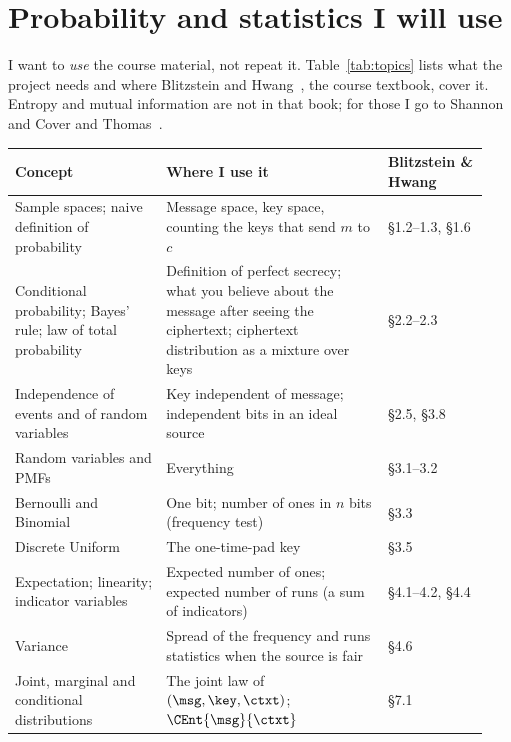 \section{Probability and statistics I will use}\label{sec:topics}

I want to \emph{use} the course material, not repeat it.
Table~\ref{tab:topics} lists what the project needs and where Blitzstein and
Hwang~\cite{blitzstein2015}, the course textbook, cover it. Entropy and
mutual information are not in that book; for those I go to
Shannon~\cite{shannon1948} and Cover and Thomas~\cite{cover2006}.

\begin{table}[htbp]
  \centering
  \small
  \begin{tabular}{@{}>{\raggedright\arraybackslash}p{0.30\linewidth}>{\raggedright\arraybackslash}p{0.44\linewidth}>{\raggedright\arraybackslash}p{0.20\linewidth}@{}}
    \toprule
    Concept & Where I use it & Blitzstein \& Hwang \\
    \midrule
    Sample spaces; naive definition of probability
      & Message space, key space, counting the keys that send $m$ to $c$
      & \S1.2--1.3, \S1.6 \\
    Conditional probability; Bayes' rule; law of total probability
      & Definition of perfect secrecy; what you believe about the message
        after seeing the ciphertext; ciphertext distribution as a mixture
        over keys
      & \S2.2--2.3 \\
    Independence of events and of random variables
      & Key independent of message; independent bits in an ideal source
      & \S2.5, \S3.8 \\
    Random variables and PMFs
      & Everything
      & \S3.1--3.2 \\
    Bernoulli and Binomial
      & One bit; number of ones in $n$ bits (frequency test)
      & \S3.3 \\
    Discrete Uniform
      & The one-time-pad key
      & \S3.5 \\
    Expectation; linearity; indicator variables
      & Expected number of ones; expected number of runs (a sum of
        indicators)
      & \S4.1--4.2, \S4.4 \\
    Variance
      & Spread of the frequency and runs statistics when the source is fair
      & \S4.6 \\
    Joint, marginal and conditional distributions
      & The joint law of $(\msg, \key, \ctxt)$; $\CEnt{\msg}{\ctxt}$
      & \S7.1 \\

\end{tabular}
\end{table}
